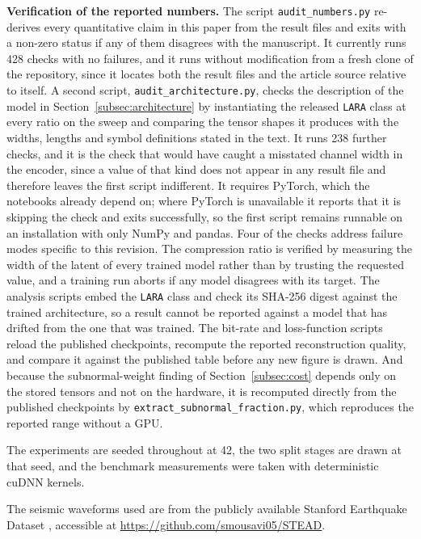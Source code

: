 \documentclass[fleqn,10pt]{wlscirep}
\begin{document}
\noindent \textbf{Verification of the reported numbers.} The script \texttt{audit\_numbers.py} re-derives every quantitative claim in this paper from the result files and exits with a non-zero status if any of them disagrees with the manuscript. It currently runs 428 checks with no failures, and it runs without modification from a fresh clone of the repository, since it locates both the result files and the article source relative to itself. A second script, \texttt{audit\_architecture.py}, checks the description of the model in Section~\ref{subsec:architecture} by instantiating the released \texttt{LARA} class at every ratio on the sweep and comparing the tensor shapes it produces with the widths, lengths and symbol definitions stated in the text. It runs 238 further checks, and it is the check that would have caught a misstated channel width in the encoder, since a value of that kind does not appear in any result file and therefore leaves the first script indifferent. It requires PyTorch, which the notebooks already depend on; where PyTorch is unavailable it reports that it is skipping the check and exits successfully, so the first script remains runnable on an installation with only NumPy and pandas. Four of the checks address failure modes specific to this revision. The compression ratio is verified by measuring the width of the latent of every trained model rather than by trusting the requested value, and a training run aborts if any model disagrees with its target. The analysis scripts embed the \texttt{LARA} class and check its SHA-256 digest against the trained architecture, so a result cannot be reported against a model that has drifted from the one that was trained. The bit-rate and loss-function scripts reload the published checkpoints, recompute the reported reconstruction quality, and compare it against the published table before any new figure is drawn. And because the subnormal-weight finding of Section~\ref{subsec:cost} depends only on the stored tensors and not on the hardware, it is recomputed directly from the published checkpoints by \texttt{extract\_subnormal\_fraction.py}, which reproduces the reported range without a GPU.

The experiments are seeded throughout at 42, the two split stages are drawn at that seed, and the benchmark measurements were taken with deterministic cuDNN kernels.

\noindent The seismic waveforms used are from the publicly available Stanford Earthquake Dataset \cite{mousavi2019stanford}, accessible at \url{https://github.com/smousavi05/STEAD}.
\end{document}

